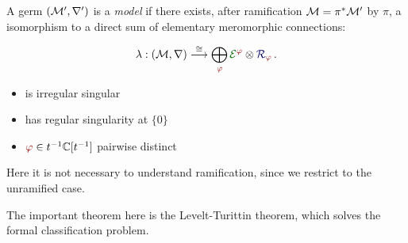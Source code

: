 \begin{defn}\label{defn:model}
  \def\myPhi{\textcolor{red!60!black}{\phi}}
  \def\myE{\textcolor{green!40!black}{\cE^{\myPhi}}}
  A germ $(\mathcal{M}',\nabla')$ is a \emph{model} if there exists, after ramification
  $\mathcal{M}=\pi^*\mathcal{M}'$ by $\pi$, a isomorphism to a direct sum of elementary
  meromorphic connections:
  \begin{multicols}{2}
    \[
      \lambda:(\cM,\nabla)
      \overset{\cong}{\longrightarrow}
      \bigoplus_{~\tikzmark{e3}\!\!\myPhi}
      \overset{\tikzmark{e2}}{\myE}
      \otimes
      \overset{\tikzmark{e1}}{\textcolor{blue!40!black}{\cR_{\myPhi}}}
      \,.
    \]
    \columnbreak{}
    \begin{itemize}
      \item[\tikzmarkb{n2}{green}] is irregular singular
      \item[\tikzmarkc{n1}{blue}] has regular singularity at $\{0\}$
      \item[\tikzmarkc{n3}{red}] $\myPhi\in t^{-1}\C[t^{-1}]$ pairwise distinct
    \end{itemize}
  \end{multicols}
  \begin{s-rem}
    Here it is not necessary to understand ramification, since we restrict to
    the unramified case.
  \end{s-rem}
\end{defn}
The important theorem here is the Levelt-Turittin theorem, which solves the
formal classification problem.
